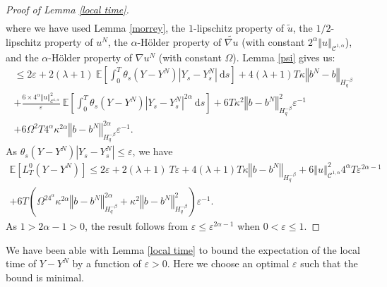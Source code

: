 \documentclass[11pt]{article}
\newcommand{\norme}[1]{\left\Vert #1\right\Vert}
\newcommand{\E}{\mathbb{E}}
\newcommand{\di}{\mathrm{d}}
\begin{document}
\begin{proof}[Proof of Lemma \ref{local time}]
\begin{multline*}
    \end{multline*}
    where we have used Lemma \ref{morrey}, the $1$-lipschitz property of $\widetilde{u}$, the $1/2$-lipschitz property of $u^N$, the $\alpha$-Hölder property of $\widetilde{\nabla u}$ (with constant $2^\alpha\norme{u}_{\mathcal{C}^{1,\alpha}}$), and the $\alpha$-Hölder property of $\nabla u^N$ (with constant $\Omega$). Lemma \ref{psi} gives us:
    \begin{multline*}
    \leq 2\varepsilon + 2(\lambda + 1)\ \E\left[\int_0^T\theta_s\left(Y-Y^N\right)\left|Y_s - Y^N_s\right|\ \di s \right] + 4(\lambda + 1)T\kappa\norme{b^N-b}_{H^{-\beta}_{q}} \\  
    +\frac{6\times4^{\alpha}\norme{u}_{\mathcal{C}^{1,\alpha}}^2}{\varepsilon}\ \E\left[\int_0^T \theta_s\left(Y-Y^N\right)\left|Y_s - Y^N_s\right|^{2\alpha}\ \di s\right]+ 6T\kappa^2\norme{b-b^N}_{H^{-\beta}_{q}}^2\varepsilon^{-1}\\   + 6\Omega^2T4^{\alpha}\kappa^{2\alpha} \norme{b-b^N}_{H^{-\beta}_q}^{2\alpha}\varepsilon^{-1}.
    \end{multline*}
    As $\theta_s(Y-Y^N)\left|Y_s - Y^N_s\right|\leq \varepsilon$, we have    
    \begin{multline*}
    \E\left[L^0_T(Y-Y^N)\right]\leq 2\varepsilon + 2(\lambda + 1)\ T\varepsilon
    +4(\lambda + 1)T\kappa\norme{b-b^N}_{H^{-\beta}_{q}}+6\norme{u}_{\mathcal{C}^{1,\alpha}}^2 4^{\alpha}T \varepsilon^{2\alpha-1} \\ + 6T\left(\Omega^24^{\alpha}\kappa^{2\alpha} \norme{b-b^N}_{H^{-\beta}_q}^{2\alpha}+\kappa^2\norme{b-b^N}_{H^{-\beta}_{q}}^2\right)\varepsilon^{-1}.
    \end{multline*}    
    As $1>2\alpha-1>0$, the result follows from $\varepsilon\leq\varepsilon^{2\alpha-1}$ when $0<\varepsilon\leq1$.  
    
\end{proof} 

We have been able with Lemma \ref{local time} to bound the expectation of the local time of $Y-Y^N$ by a function of $\varepsilon>0$. Here we choose an optimal $\varepsilon$ such that the bound is minimal.
\end{document}
